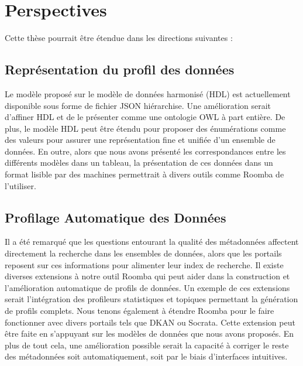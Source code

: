 \section{Perspectives}

Cette th\`{e}se pourrait être \'{e}tendue dans les directions suivantes :

\subsection{Repr\'{e}sentation du profil des donn\'{e}es}
Le mod\`{e}le propos\'{e} sur le mod\`{e}le de donn\'{e}es harmonis\'{e} (HDL) est actuellement disponible sous forme de fichier JSON hi\'{e}rarchise. Une am\'{e}lioration serait d'affiner HDL et de le pr\'{e}senter comme une ontologie OWL à part enti\`{e}re. De plus, le mod\`{e}le HDL peut être \'{e}tendu pour proposer des \'{e}num\'{e}rations comme des valeurs pour assurer une repr\'{e}sentation fine et unifi\'{e}e d'un ensemble de donn\'{e}es. En outre, alors que nous avons pr\'{e}sent\'{e} les correspondances entre les diff\'{e}rents mod\`{e}les dans un tableau, la pr\'{e}sentation de ces donn\'{e}es dans un format lisible par des machines permettrait à divers outils comme Roomba de l'utiliser.

\subsection{Profilage Automatique des Donn\'{e}es}
Il a \'{e}t\'{e} remarqu\'{e} que les questions entourant la qualit\'{e} des m\'{e}tadonn\'{e}es affectent directement la recherche dans les ensembles de donn\'{e}es, alors que les portails reposent sur ces informations pour alimenter leur index de recherche. Il existe diverses extensions à notre outil Roomba qui peut aider dans la construction et l'am\'{e}lioration automatique de profils de donn\'{e}es. Un exemple de ces extensions serait l'int\'{e}gration des profileurs statistiques et topiques permettant la g\'{e}n\'{e}ration de profils complets. Nous tenons \'{e}galement à \'{e}tendre Roomba pour le faire fonctionner avec divers portails tels que DKAN ou Socrata. Cette extension peut être faite en s'appuyant sur les mod\`{e}les de donn\'{e}es que nous avons propos\'{e}s. En plus de tout cela, une am\'{e}lioration possible serait la capacit\'{e} à corriger le reste des m\'{e}tadonn\'{e}es soit automatiquement, soit par le biais d'interfaces intuitives.

